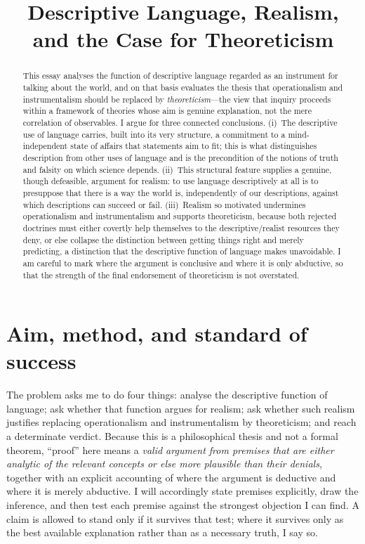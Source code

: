 \documentclass[12pt]{article}
\title{Descriptive Language, Realism, and the Case for Theoreticism}
\author{}
\date{}
\begin{document}
\maketitle

\begin{abstract}
This essay analyses the function of descriptive language regarded as an
instrument for talking about the world, and on that basis evaluates the
thesis that operationalism and instrumentalism should be replaced by
\emph{theoreticism}---the view that inquiry proceeds within a framework of
theories whose aim is genuine explanation, not the mere correlation of
observables. I argue for three connected conclusions. (i)~The
descriptive use of language carries, built into its very structure, a
commitment to a mind-independent state of affairs that statements aim to
fit; this is what distinguishes description from other uses of language
and is the precondition of the notions of truth and falsity on which
science depends. (ii)~This structural feature supplies a genuine, though
defeasible, argument for realism: to use language descriptively at all is
to presuppose that there is a way the world is, independently of our
descriptions, against which descriptions can succeed or fail.
(iii)~Realism so motivated undermines operationalism and instrumentalism
and supports theoreticism, because both rejected doctrines must either
covertly help themselves to the descriptive/realist resources they deny,
or else collapse the distinction between getting things right and merely
predicting, a distinction that the descriptive function of language makes
unavoidable. I am careful to mark where the argument is conclusive and
where it is only abductive, so that the strength of the final
endorsement of theoreticism is not overstated.
\end{abstract}

\section{Aim, method, and standard of success}

The problem asks me to do four things: analyse the descriptive function
of language; ask whether that function argues for realism; ask whether
such realism justifies replacing operationalism and instrumentalism by
theoreticism; and reach a determinate verdict. Because this is a
philosophical thesis and not a formal theorem, ``proof'' here means a
\emph{valid argument from premises that are either analytic of the
relevant concepts or else more plausible than their denials}, together
with an explicit accounting of where the argument is deductive and where
it is merely abductive. I will accordingly state premises explicitly,
draw the inference, and then test each premise against the strongest
objection I can find. A claim is allowed to stand only if it survives
that test; where it survives only as the best available explanation
rather than as a necessary truth, I say so.
\end{document}
